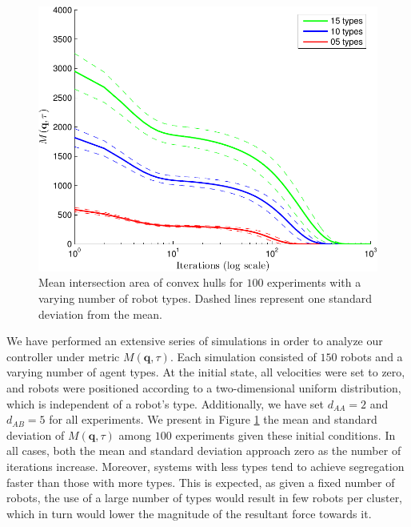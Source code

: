 \documentclass[letterpaper, 10 pt, conference]{ieeeconf}  %
\begin{document}
\begin{figure}[htpb]
  \centering
  \includegraphics[width=\columnwidth]{chull.pdf}
  \caption{Mean intersection area of convex hulls for $100$
    experiments with a varying number of robot types. Dashed lines
    represent one standard deviation from the mean.}
  \label{fig:chull}
\end{figure}

We have performed an extensive series of simulations in order to
analyze our controller under metric $M(\mathbf{q}, \tau)$. Each
simulation consisted of $150$ robots and a varying number of agent
types. At the initial state, all velocities were set to zero, and
robots were positioned according to a two-dimensional uniform
distribution, which is independent of a robot's type. Additionally, we
have set $d_{AA} = 2$ and $d_{AB} = 5$ for all experiments. We present
in Figure \ref{fig:chull} the mean and standard deviation of
$M(\mathbf{q},\tau)$ among $100$ experiments given these initial
conditions. In all cases, both the mean and standard deviation
approach zero as the number of iterations increase. Moreover, systems
with less types tend to achieve segregation faster than those with
more types. This is expected, as given a fixed number of robots, the
use of a large number of types would result in few robots per
cluster, which in turn would lower the magnitude of the resultant
force towards it.
\end{document}
